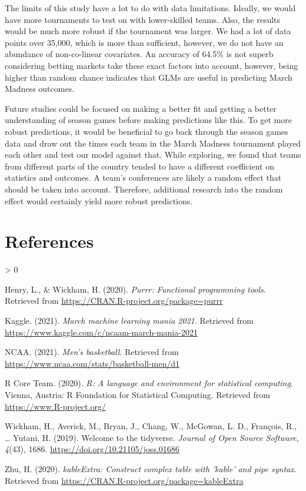 \documentclass[
  man,floatsintext]{apa6}
\newlength{\cslhangindent}
\newenvironment{CSLReferences}[2] %
 {%
  \setlength{\parindent}{0pt}
  \ifodd #1 \everypar{\setlength{\hangindent}{\cslhangindent}}\ignorespaces\fi
  \ifnum #2 > 0
  \setlength{\parskip}{#2\baselineskip}
  \fi
 }%
 {}
\begin{document}
The limits of this study have a lot to do with data limitations. Ideally, we would have more tournaments to test on with lower-skilled teams. Also, the results would be much more robust if the tournament was larger. We had a lot of data points over 35,000, which is more than sufficient, however, we do not have an abundance of non-co-linear covariates. An accuracy of 64.5\% is not superb considering betting markets take these exact factors into account, however, being higher than random chance indicates that GLMs are useful in predicting March Madness outcomes.

Future studies could be focused on making a better fit and getting a better understanding of season games before making predictions like this. To get more robust predictions, it would be beneficial to go back through the season games data and draw out the times each team in the March Madness tournament played each other and test our model against that. While exploring, we found that teams from different parts of the country tended to have a different coefficient on statistics and outcomes. A team's conferences are likely a random effect that should be taken into account. Therefore, additional research into the random effect would certainly yield more robust predictions.

\newpage

\hypertarget{references}{%
\section{References}\label{references}}

\begingroup
\setlength{\parindent}{-0.5in}
\setlength{\leftskip}{0.0in}

\hypertarget{refs}{}
\begin{CSLReferences}{1}{0}
\leavevmode\hypertarget{ref-R-purrr}{}%
Henry, L., \& Wickham, H. (2020). \emph{Purrr: Functional programming tools}. Retrieved from \url{https://CRAN.R-project.org/package=purrr}

\leavevmode\hypertarget{ref-R-Kaggle}{}%
Kaggle. (2021). \emph{March machine learning mania 2021}. Retrieved from \url{https://www.kaggle.com/c/ncaam-march-mania-2021}

\leavevmode\hypertarget{ref-R-NCAA}{}%
NCAA. (2021). \emph{Men's basketball}. Retrieved from \url{https://www.ncaa.com/stats/basketball-men/d1}

\leavevmode\hypertarget{ref-R-base}{}%
R Core Team. (2020). \emph{R: A language and environment for statistical computing}. Vienna, Austria: R Foundation for Statistical Computing. Retrieved from \url{https://www.R-project.org/}

\leavevmode\hypertarget{ref-R-tidyverse}{}%
Wickham, H., Averick, M., Bryan, J., Chang, W., McGowan, L. D., François, R., \ldots{} Yutani, H. (2019). Welcome to the {tidyverse}. \emph{Journal of Open Source Software}, \emph{4}(43), 1686. \url{https://doi.org/10.21105/joss.01686}

\leavevmode\hypertarget{ref-R-kableExtra}{}%
Zhu, H. (2020). \emph{kableExtra: Construct complex table with 'kable' and pipe syntax}. Retrieved from \url{https://CRAN.R-project.org/package=kableExtra}

\end{CSLReferences}

\endgroup
\end{document}
